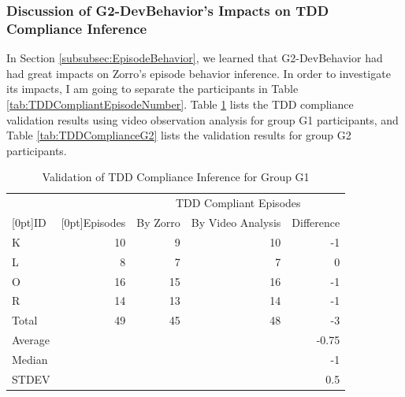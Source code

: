 \subsubsection{Discussion of G2-DevBehavior's Impacts on TDD Compliance Inference}
In Section \ref{subsubsec:EpisodeBehavior}, we learned that
G2-DevBehavior had had great impacts on Zorro's episode behavior
inference. In order to investigate its impacts, I am going to separate
the participants in Table \ref{tab:TDDCompliantEpisodeNumber}.  Table
\ref{tab:TDDComplianceG1} lists the TDD compliance validation results
using video observation analysis for group G1 participants, and Table
\ref{tab:TDDComplianceG2} lists the validation results for
group G2 participants.
\begin{table}[!ht]
\centering
  \begin{tabular}{|l|r|r|r|r|}
  \hline
    &  &  \multicolumn{3}{c|}{TDD Compliant Episodes} \\ \cline{3-5}
    \raisebox{1.5ex}[0pt]{ID} & \raisebox{1.5ex}[0pt]{Episodes}  & 
     By Zorro &  By Video Analysis & Difference \\ \hline
    K       & 10   &   9  & 10   & -1    \\ \hline
    L       &  8   &   7  &  7   &  0    \\ \hline  
    O       & 16   &  15  & 16   & -1    \\ \hline
    R       & 14   &  13  & 14   & -1    \\ \hline 
    Total   & 49   &  45  & 48	 & -3    \\ \hline 
    Average &      &      &  & -0.75 \\ \hline
    Median  &      &      &  & -1    \\ \hline
    STDEV   &      &      &  & 0.5   \\ \hline
    \end{tabular}
  \caption{Validation of TDD Compliance Inference for Group G1}
  \label{tab:TDDComplianceG1} 
\end{table}
